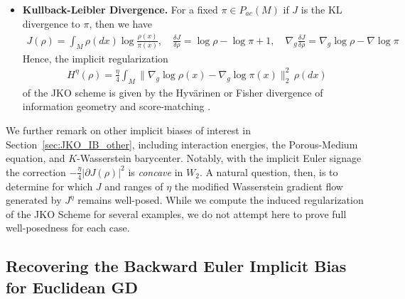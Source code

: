 \documentclass[reqno,11pt,letterpaper]{amsart}
\theoremstyle{plain}
\theoremstyle{definition}
\theoremstyle{remark}
\begin{document}
\begin{itemize}[leftmargin=*]
\item \textbf{Kullback-Leibler Divergence.} For a fixed $\pi \in P_{ac}(M)$ if $J$ is the KL divergence to $\pi$, then we have
\begin{align*}
J(\rho) = \int_M \rho(dx) \log \frac{\rho(x)}{\pi(x)}, \quad \frac{\delta J}{\delta \rho} = \log \rho- \log \pi +1, \quad \nabla_g \frac{\delta J}{\delta \rho} = \nabla_g \log \rho - \nabla \log \pi
\end{align*}
Hence, the implicit regularization \begin{align}
    &H^{\eta}(\rho) = \frac{\eta}{4} \int_M \lVert \nabla_g \log \rho(x) - \nabla_g \log \pi(x) \rVert_{2}^{2} \,\rho(dx)
\end{align}
of the JKO scheme is given by the Hyv{\"a}rinen or Fisher divergence \cite{Otto2000} of information geometry and score-matching \cite{hyvarinen05a}.
\end{itemize}

We further remark on other implicit biases of interest in Section~\ref{sec:JKO_IB_other}, including interaction energies, the Porous-Medium equation, and $K$-Wasserstein barycenter. Notably, with the implicit Euler signage the correction $-\frac{\eta}{4} |\partial J (\rho)|^2$ is \emph{concave} in $W_{2}$. A natural question, then, is to determine for which $J$ and ranges of $\eta$ the modified Wasserstein gradient flow generated by $J^{\eta}$ remains well-posed. While we compute the induced regularization of the JKO Scheme for several examples, we do not attempt here to prove full well-posedness for each case.


\subsection{Recovering the Backward Euler Implicit Bias for Euclidean GD}\label{sec:GD_IB}
\end{document}
